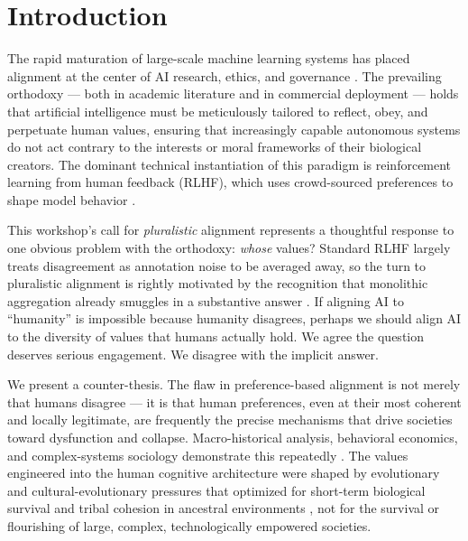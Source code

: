 \documentclass{article}
\theoremstyle{plain}
\theoremstyle{definition}
\theoremstyle{remark}
\begin{document}

\section{Introduction}
\label{sec:intro}

The rapid maturation of large-scale machine learning systems has placed alignment at the center of AI research, ethics, and governance \citep{russell2019human, bostrom2014superintelligence, gabriel2020artificial}. The prevailing orthodoxy --- both in academic literature and in commercial deployment --- holds that artificial intelligence must be meticulously tailored to reflect, obey, and perpetuate human values, ensuring that increasingly capable autonomous systems do not act contrary to the interests or moral frameworks of their biological creators. The dominant technical instantiation of this paradigm is reinforcement learning from human feedback (RLHF), which uses crowd-sourced preferences to shape model behavior \citep{christiano2017deep, ouyang2022training, askell2021general}.

This workshop's call for \emph{pluralistic} alignment \citep{sorensen2024roadmap, conitzer2024social} represents a thoughtful response to one obvious problem with the orthodoxy: \emph{whose} values? Standard RLHF largely treats disagreement as annotation noise to be averaged away, so the turn to pluralistic alignment is rightly motivated by the recognition that monolithic aggregation already smuggles in a substantive answer \citep{gabriel2020artificial, sorensen2024roadmap}. If aligning AI to ``humanity'' is impossible because humanity disagrees, perhaps we should align AI to the diversity of values that humans actually hold. We agree the question deserves serious engagement. We disagree with the implicit answer.

We present a counter-thesis. The flaw in preference-based alignment is not merely that humans disagree --- it is that human preferences, even at their most coherent and locally legitimate, are frequently the precise mechanisms that drive societies toward dysfunction and collapse. Macro-historical analysis, behavioral economics, and complex-systems sociology demonstrate this repeatedly \citep{diamond2011collapse, acemoglu2012why}. The values engineered into the human cognitive architecture were shaped by evolutionary and cultural-evolutionary pressures that optimized for short-term biological survival and tribal cohesion in ancestral environments \citep{cosmides1992psychological, henrich2020weirdest}, not for the survival or flourishing of large, complex, technologically empowered societies.
\end{document}
